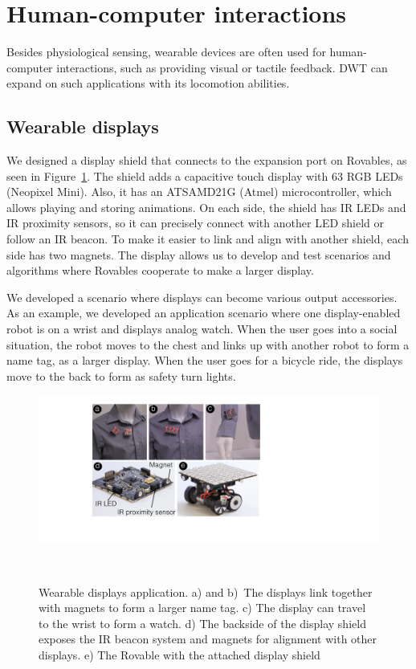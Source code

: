 \section{Human-computer interactions}
Besides physiological sensing, wearable devices are often used for human-computer interactions, such as providing visual or tactile feedback. DWT can expand on such applications with its locomotion abilities. 

\subsection{Wearable displays}
We designed a display shield that connects to the expansion port on Rovables, as seen in Figure~\ref{fig:displays}. The shield adds a capacitive touch display with 63 RGB LEDs (Neopixel Mini). Also, it has an ATSAMD21G (Atmel) microcontroller, which allows playing and storing animations. On each side, the shield has IR LEDs and IR proximity sensors, so it can precisely connect with another LED shield or follow an IR beacon. To make it easier to link and align with another shield, each side has two magnets. The display allows us to develop and test scenarios and algorithms where Rovables cooperate to make a larger display. 

We developed a scenario where displays can become various output accessories. 
As an example, we developed an application scenario where one display-enabled robot is on a wrist and displays analog watch. When the user goes into a social situation, the robot moves to the chest and links up with another robot to form a name tag, as a larger display. When the user goes for a bicycle ride, the displays move to the back to form as safety turn lights.

\begin{figure}[h]
\centering
  \includegraphics[width=1\columnwidth]{pictures/chapter4/displays_medium.pdf}
  \caption{Wearable displays application. a) and b)~The displays link together with magnets to form a larger name tag. c) The display can travel to the wrist to form a watch. d) The backside of the display shield exposes the IR beacon system and magnets for alignment with other displays. e) The Rovable with the attached display shield }~\label{fig:displays}
\end{figure}


